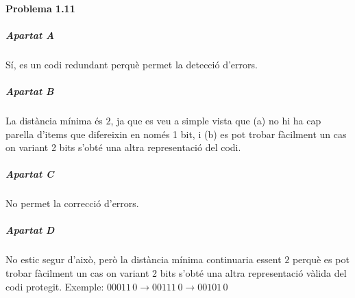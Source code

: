 \finishpage


\page

\paragraph{Problema 1.11}

\subparagraph{Apartat A}

Sí, es un codi redundant perquè permet la detecció d'errors.

\subparagraph{Apartat B}

La distància mínima és $2$, ja que es veu a simple vista que (a) no hi
ha cap parella d'items que difereixin en només 1 bit, i (b) es pot trobar fàcilment
un cas on variant 2 bits s'obté una altra representació del codi.

\subparagraph{Apartat C}

No permet la correcció d'errors.

\subparagraph{Apartat D}

No estic segur d'això, però la distància mínima continuaria essent $2$
perquè es pot trobar fàcilment un cas on variant 2 bits s'obté una altra representació
vàlida del codi protegit. Exemple: $00011\,0 \rightarrow 00111\,0 \rightarrow 00101\,0$

\finishpage


